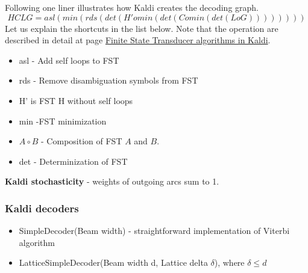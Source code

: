 Following one liner illustrates how Kaldi creates the decoding graph. 
\begin{equation}
   HCLG = asl(min(rds(det(H' o min(det(C o min(det(L o G)))))))) 
\end{equation}
Let us explain the shortcuts in the list below. Note that the operation are described in detail
at page \href{http://kaldi.sourceforge.net/fst_algo.html#fst_algo_stochastic} {Finite State Transducer algorithms in Kaldi}. 
\begin{itemize}
    \item asl - Add self loops to \ac{FST}
    \item rds - Remove disambiguation symbols from \ac{FST}
    \item H' is \ac{FST} H without self loops
    \item min -\ac{FST} minimization
    \item $A\circ B$  - Composition of \ac{FST} $A$ and $B$.
    \item det - Determinization of \ac{FST}
\end{itemize}

{\bf Kaldi stochasticity} - weights of outgoing arcs sum to 1.


\subsubsection*{Kaldi decoders} %
\begin{itemize}
    \item SimpleDecoder(Beam width) - straightforward implementation of Viterbi algorithm
    \item LatticeSimpleDecoder(Beam width d, Lattice delta $\delta$), where $ \delta \le d$

\end{itemize}



